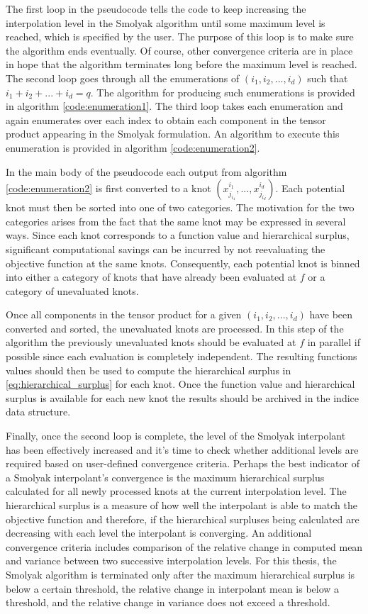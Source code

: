 The first loop in the pseudocode tells the code to keep increasing the interpolation level in the Smolyak algorithm until some maximum level is reached, which is specified by the user. The purpose of this loop is to make sure the algorithm ends eventually. Of course, other convergence criteria are in place in hope that the algorithm terminates long before the maximum level is reached. The second loop goes through all the enumerations of $(i_1,i_2,...,i_d)$ such that $i_1 + i_2 + ... + i_d = q$. The algorithm for producing such enumerations is provided in algorithm \ref{code:enumeration1}. The third loop takes each enumeration and again enumerates over each index to obtain each component in the tensor product appearing in the Smolyak formulation. An algorithm to execute this enumeration is provided in algorithm \ref{code:enumeration2}.

In the main body of the pseudocode each output from algorithm \ref{code:enumeration2} is first converted to a knot $(x^{i_1}_{j_{i_1}}, ..., x^{i_d}_{j_{i_d}})$. Each potential knot must then be sorted into one of two categories. The motivation for the two categories arises from the fact that the same knot may be expressed in several ways. Since each knot corresponds to a function value and hierarchical surplus, significant computational savings can be incurred by not reevaluating the objective function at the same knots. Consequently, each potential knot is binned into either a category of knots that have already been evaluated at $f$ or a category of unevaluated knots.

Once all components in the tensor product for a given $(i_1,i_2,...,i_d)$ have been converted and sorted, the unevaluated knots are processed. In this step of the algorithm the previously unevaluated knots should be evaluated at $f$ in parallel if possible since each evaluation is completely independent. The resulting functions values should then be used to compute the hierarchical surplus in \ref{eq:hierarchical_surplus} for each knot. Once the function value and hierarchical surplus is available for each new knot the results should be archived in the indice data structure.     

Finally, once the second loop is complete, the level of the Smolyak interpolant has been effectively increased and it's time to check whether additional levels are required based on user-defined convergence criteria. Perhaps the best indicator of a Smolyak interpolant's convergence is the maximum hierarchical surplus calculated for all newly processed knots at the current interpolation level. The hierarchical surplus is a measure of how well the interpolant is able to match the objective function and therefore, if the hierarchical surpluses being calculated are decreasing with each level the interpolant is converging. An additional convergence criteria includes comparison of the relative change in computed mean and variance between two successive interpolation levels. For this thesis, the Smolyak algorithm is terminated only after the maximum hierarchical surplus is below a certain threshold, the relative change in interpolant mean is below a threshold, and the relative change in variance does not exceed a threshold. 